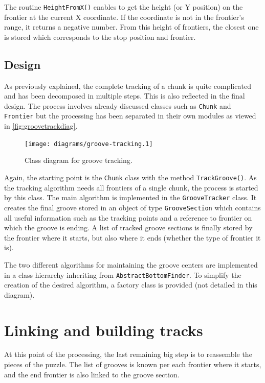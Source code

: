 The routine \texttt{HeightFromX()} enables to get the height (or Y position) on the frontier at the current X coordinate. If the coordinate is not in the frontier's range, it returns a negative number. From this height of frontiers, the closest one is stored which corresponds to the stop position and frontier.

\subsection{Design}

As previously explained, the complete tracking of a chunk is quite complicated and has been decomposed in multiple steps. This is also reflected in the final design. The process involves already discussed classes such as \texttt{Chunk} and \texttt{Frontier} but the processing has been separated in their own modules as viewed in \autoref{fig:groovetrackdiag}.

\begin{figure}[!ht]
\centering
\texttt{[image: diagrams/groove-tracking.1]}
\caption{Class diagram for groove tracking.}
\label{fig:groovetrackdiag}
\end{figure}

Again, the starting point is the \texttt{Chunk} class with the method \texttt{TrackGroove()}. As the tracking algorithm needs all frontiers of a single chunk, the process is started by this class. The main algorithm is implemented in the \texttt{GrooveTracker} class. It creates the final groove stored in an object of type \texttt{GrooveSection} which contains all useful information such as the tracking points and a reference to frontier on which the groove is ending. A list of tracked groove sections is finally stored by the frontier where it starts, but also where it ends (whether the type of frontier it is).

The two different algorithms for maintaining the groove centers are implemented in a class hierarchy inheriting from \texttt{AbstractBottomFinder}. To simplify the creation of the desired algorithm, a factory class is provided (not detailed in this diagram).

\section{Linking and building tracks}

At this point of the processing, the last remaining big step is to reassemble the pieces of the puzzle. The list of grooves is known per each frontier where it starts, and the end frontier is also linked to the groove section.

